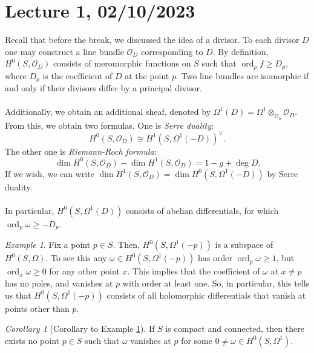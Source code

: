 \documentclass[a4paper]{report}
\theoremstyle{definition}
\theoremstyle{remark}
\theoremstyle{proposition}
\theoremstyle{conjecture}
\theoremstyle{lemma}
\theoremstyle{corollary}
\newtheorem{corollary}{Corollary}
\theoremstyle{exercise}
\theoremstyle{example}
\newtheorem{example}{Example}
\newcommand{\mcal}{\mathcal}
\newcommand{\on}{\operatorname}
\begin{document}
\section{Lecture 1, 02/10/2023}

Recall that before the break, we discussed the idea of a divisor.
To each divisor $D$ one may construct a line bundle $\mcal{O}_D$ corresponding
to $D$. By definition, 
$H^0(S,\mcal{O}_D)$ consists of meromorphic functions on $S$ such that 
$\on{ord}_pf \geq D_p$, where $D_p$ is the coefficient of $D$ at the point 
$p$. Two line bundles are isomorphic if and only if 
their divisors differ by a principal divisor. \\\\
Additionally, we obtain an additional sheaf, denoted by $\Omega^1(D) = \Omega^1\otimes_{\mcal{O}_S}\mcal{O}_D$.
From this, we obtain two formulas. One is \emph{Serre duality}:
$$H^0(S,\mcal{O}_D) \cong H^1(S,\Omega^1(-D))^\vee.$$
The other one is \emph{Riemann-Roch formula}: 
$$\dim H^0(S,\mcal{O}_D) - \dim H^1(S,\mcal{O}_D) = 1 - g + \deg D.$$
If we wish, we can write 
$\dim H^1(S,\mcal{O}_D) = \dim H^0(S,\Omega^1(-D))$ by Serre duality.\\\\
In particular, $H^0(S,\Omega^1(D))$ consists of abelian differentials,
for which $\on{ord}_p\omega \geq -D_p$.

\begin{example}\label{exam30}
    Fix a point $p\in S$. Then, 
    $H^0(S,\Omega^1(-p))$ is a subspace of $H^0(S,\Omega)$. To see this
    any $\omega \in H^0(S,\Omega^1(-p))$ has order 
    $\on{ord}_p\omega \geq 1$, but $\on{ord}_x\omega\geq 0$ for any other 
    point $x$. This implies that the coefficient of $\omega$ at $x\neq p$ has no 
    poles, and vanishes at $p$ with order at least one.
    So, in particular, this tells us that $H^0(S,\Omega^1(-p))$ consists
    of all holomorphic differentials that vanish at points other than $p$.
\end{example}

\begin{corollary}[Corollary to Example \ref{exam30}]\label{cor25}
    If $S$ is compact and connected, then there exists no point $p\in S$ 
    such that $\omega$ vanishes at $p$ for some $0\neq \omega \in H^0(S,\Omega^1)$.
\end{corollary}
\end{document}
